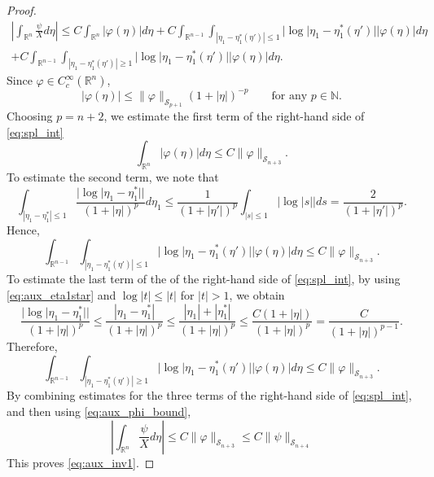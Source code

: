 \documentclass[12pt,a4paper]{amsart}
\numberwithin{equation}{section}
\theoremstyle{plain}
\theoremstyle{definition}
\begin{document}
\begin{proof}
\begin{multline}\label{eq:spl_int}
    \left|\int_{\mathbb{R}^n}\frac{\psi}{X} d\eta\right|
  \leq 
  C\int_{\mathbb{R}^n} |\varphi(\eta)| d\eta
  + C \int_{\mathbb{R}^{n-1}}\int_{|\eta_1 - \eta_1^*(\eta')| \leq 1} |\log|\eta_1-\eta_1^*(\eta')| |\varphi(\eta)| d\eta\\
  + C \int_{\mathbb{R}^{n-1}}\int_{|\eta_1 - \eta_1^*(\eta')| \geq 1} |\log|\eta_1-\eta_1^*(\eta')| |\varphi(\eta)| d\eta.
\end{multline}
Since $\varphi \in C_c^\infty(\mathbb{R}^n)$,
\begin{equation*}
    |\varphi(\eta)|\le\|\varphi\|_{\mathscr{S}_{p+1}}(1+|\eta|)^{-p}
    \qquad
    \text{for any } p\in \mathbb{N}.
\end{equation*}
Choosing $p = n + 2$, we estimate the first term of the right-hand side of \eqref{eq:spl_int}
\begin{equation*}
    \int_{\mathbb{R}^n} |\varphi(\eta)| d\eta \leq C \|\varphi\|_{\mathscr{S}_{n+3}}.
\end{equation*}
To estimate the second term, we note that
\begin{equation*}
    \int_{|\eta_1-\eta_1^*|\leq 1}\frac{|\log|\eta_1-\eta_1^*||}{(1+|\eta|)^p} d\eta_1
    \leq \frac{1}{(1+|\eta'|)^p}\int_{|s|\leq 1}|\log|s|| ds
    = \frac{2}{(1+|\eta'|)^p}.
\end{equation*}
Hence,
\begin{equation*}
    \int_{\mathbb{R}^{n-1}}\int_{|\eta_1 - \eta_1^*(\eta')| \leq 1} |\log|\eta_1-\eta_1^*(\eta')| |\varphi(\eta)| d\eta \leq  C \|\varphi\|_{\mathscr{S}_{n+3}}.
\end{equation*}
To estimate the last term of the of the right-hand side of \eqref{eq:spl_int}, by using \eqref{eq:aux_eta1star} and $\log|t|\le|t|$ for $|t|>1$, we obtain
\begin{equation*}
    \frac{|\log|\eta_1-\eta_1^*||}{(1+|\eta|)^p}
    \leq 
    \frac{|\eta_1-\eta_1^*|}{(1+|\eta|)^p}
    \leq
    \frac{|\eta_1|+|\eta_1^*|}{(1+|\eta|)^p}
    \leq
    \frac{C(1+|\eta|)}{(1+|\eta|)^p}=\frac{C}{(1+|\eta|)^{p-1}}.
\end{equation*}
Therefore,
\begin{equation*}
    \int_{\mathbb{R}^{n-1}}\int_{|\eta_1 - \eta_1^*(\eta')| \geq 1} |\log|\eta_1-\eta_1^*(\eta')| |\varphi(\eta)| d\eta \leq  C \|\varphi\|_{\mathscr{S}_{n+3}}.
\end{equation*}
By combining estimates for the three terms of the right-hand side of \eqref{eq:spl_int}, and then using \eqref{eq:aux_phi_bound}, 
\begin{equation*}
    \left|\int_{\mathbb{R}^n}\frac{\psi}{X}d\eta\right|
    \leq C\|\varphi\|_{\mathscr{S}_{n+3}}
    \leq C\|\psi\|_{\mathscr{S}_{n+4}}
\end{equation*}
This proves \eqref{eq:aux_inv1}.


\end{proof}
\end{document}
